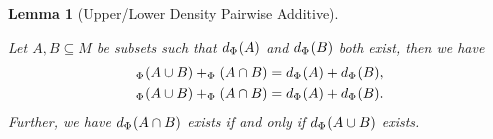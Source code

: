 \documentclass[
  british,
]{article}
\theoremstyle{plain}
\theoremstyle{plain}
\newtheorem{lemma}{Lemma}[section]
\theoremstyle{definition}
\theoremstyle{remark}
\newcommand{\Monoid}{{M}}
\newcommand{\Folner}[1][\vphantom{}]{{\Phi}_{#1}}
\newcommand{\LowerDensity}[2][\Folner]{_{{#1}}({#2})}
\newcommand{\Density}[2][\Folner]{d_{{#1}}({#2})}
\newcommand{\UpperDensity}[2][\Folner]{_{{#1}}({#2})}
\begin{document}
\begin{lemma}[Upper/Lower Density Pairwise
Additive]\protect\hypertarget{lem-DensityPairwiseAdditivity}{}\label{lem-DensityPairwiseAdditivity}

Let \(A,B\subseteq\Monoid\) be subsets such that \(\Density{A}\) and
\(\Density{B}\) both exist, then we have \begin{align*}
    \UpperDensity{A\cup B}+\LowerDensity{A\cap B}&=\Density{A}+\Density{B},
    \\\LowerDensity{A\cup B}+\UpperDensity{A\cap B}&=\Density{A}+\Density{B}.
\end{align*} Further, we have \(\Density{A\cap B}\) exists if and only
if \(\Density{A\cup B}\) exists.

\end{lemma}
\end{document}
